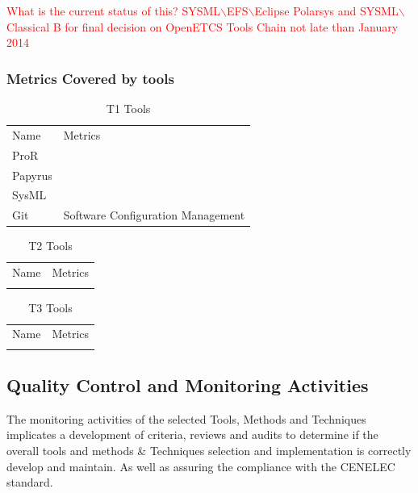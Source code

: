 \documentclass{template/openetcs_article}
\begin{document}
\textcolor{red}{What is the current status of this? SYSML$\backslash$EFS$\backslash$Eclipse Polarsys and SYSML$\backslash$Classical B for final decision on OpenETCS Tools Chain not late than January 2014}

\subsubsection{Metrics Covered by tools}

\begin{table}[H]
\begin{tabular}{|m{3cm}|m{10cm}|}
\hline
\rowcolor{myblue}
\multicolumn{2}{|c|}{T1 Tools} \\\hline
\rowcolor{lightgray}
Name &
Metrics 
\\\hline
ProR & \\\hline
Papyrus & \\\hline
SysML & \\\hline
Git & Software Configuration Management\\\hline
\end{tabular}
\caption{T1 Tools}
\end{table}

\begin{table}[H]
\begin{tabular}{|m{3cm}|m{10cm}|}
\hline
\rowcolor{myblue}
\multicolumn{2}{|c|}{T2 Tools} \\\hline
\rowcolor{lightgray}
Name &
Metrics 
\\\hline
 & \\\hline
\end{tabular}
\caption{T2 Tools}
\end{table}

\begin{table}[H]
\begin{tabular}{|m{3cm}|m{10cm}|}
\hline
\rowcolor{myblue}
\multicolumn{2}{|c|}{T3 Tools} \\\hline
\rowcolor{lightgray}
Name &
Metrics 
\\\hline
 & \\\hline
\end{tabular}
\caption{T3 Tools}
\end{table}


\subsection{Quality Control and Monitoring Activities}
The monitoring activities of the selected Tools, Methods and Techniques implicates a development of criteria, reviews and audits to determine if the overall tools and methods \& Techniques selection and implementation is correctly develop and maintain. As well as assuring the compliance with the CENELEC standard.
\end{document}
